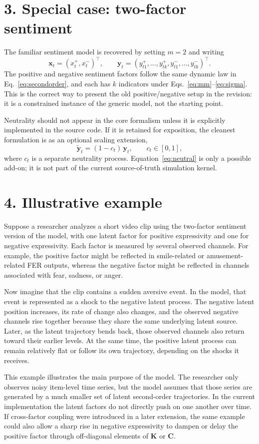 \documentclass[10pt]{article}
\begin{document}
\section*{3. Special case: two-factor sentiment}
The familiar sentiment model is recovered by setting $m=2$ and writing
\[
\bm x_t=(x_t^{+},x_t^{-})^\top,
\qquad
\bm y_t=(y_{t1}^{+},\dots,y_{tk}^{+},y_{t1}^{-},\dots,y_{tk}^{-})^\top.
\]
The positive and negative sentiment factors follow the same dynamic law in Eq.~\eqref{eq:secondorder}, and each has $k$ indicators under Eqs.~\eqref{eq:mm}--\eqref{eq:sigma}. This is the correct way to present the old positive/negative setup in the revision: it is a constrained instance of the generic model, not the starting point.

Neutrality should not appear in the core formalism unless it is explicitly implemented in the source code. If it is retained for exposition, the cleanest formulation is as an optional scaling extension,
\begin{equation}
\tilde{\bm y}_t=(1-c_t)\,\bm y_t,
\qquad c_t\in[0,1],
\label{eq:neutral}
\end{equation}
where $c_t$ is a separate neutrality process. Equation~\eqref{eq:neutral} is only a possible add-on; it is not part of the current source-of-truth simulation kernel.

\section*{4. Illustrative example}
Suppose a researcher analyzes a short video clip using the two-factor sentiment version of the model, with one latent factor for positive expressivity and one for negative expressivity. Each factor is measured by several observed channels. For example, the positive factor might be reflected in smile-related or amusement-related FER outputs, whereas the negative factor might be reflected in channels associated with fear, sadness, or anger.

Now imagine that the clip contains a sudden aversive event. In the model, that event is represented as a shock to the negative latent process. The negative latent position increases, its rate of change also changes, and the observed negative channels rise together because they share the same underlying latent source. Later, as the latent trajectory bends back, those observed channels also return toward their earlier levels. At the same time, the positive latent process can remain relatively flat or follow its own trajectory, depending on the shocks it receives.

This example illustrates the main purpose of the model. The researcher only observes noisy item-level time series, but the model assumes that those series are generated by a much smaller set of latent second-order trajectories. In the current implementation the latent factors do not directly push on one another over time. If cross-factor coupling were introduced in a later extension, the same example could also allow a sharp rise in negative expressivity to dampen or delay the positive factor through off-diagonal elements of $\bm K$ or $\bm C$.
\end{document}
